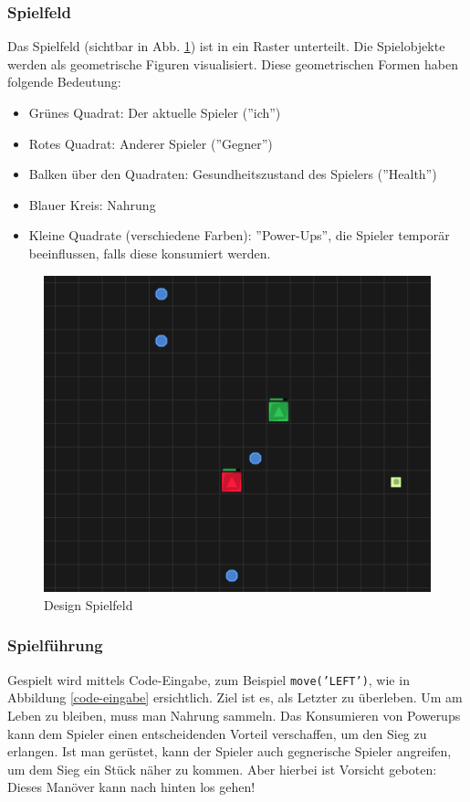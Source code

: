 \documentclass[11pt,a4paper,titlepage]{article}
\begin{document}
\subsubsection{Spielfeld}

Das Spielfeld (sichtbar in Abb. \ref{spielfeld}) ist in ein Raster unterteilt. Die Spielobjekte werden als geometrische Figuren visualisiert. Diese geometrischen Formen haben folgende Bedeutung:
\begin{itemize}
\item Grünes Quadrat: Der aktuelle Spieler (''ich'')
\item Rotes Quadrat: Anderer Spieler (''Gegner'')
\item Balken über den Quadraten: Gesundheitszustand des Spielers (''Health'')
\item Blauer Kreis: Nahrung
\item Kleine Quadrate (verschiedene Farben): ''Power-Ups'', die Spieler temporär beeinflussen, falls diese konsumiert werden.
\end{itemize}

\begin{figure}[H]
	\centering
	\includegraphics{game1.png}
	\caption{Design Spielfeld}
	\label{spielfeld}
\end{figure}

\subsubsection{Spielführung}

Gespielt wird mittels Code-Eingabe, zum Beispiel \texttt{move('LEFT')}, wie in Abbildung \ref{code-eingabe} ersichtlich. Ziel ist es, als Letzter zu überleben. Um am Leben zu bleiben, muss man Nahrung sammeln. Das Konsumieren von Powerups kann dem Spieler einen entscheidenden Vorteil verschaffen, um den Sieg zu erlangen. Ist man gerüstet, kann der Spieler auch gegnerische Spieler angreifen, um dem Sieg ein Stück näher zu kommen. Aber hierbei ist Vorsicht geboten: Dieses Manöver kann nach hinten los gehen!
\end{document}
